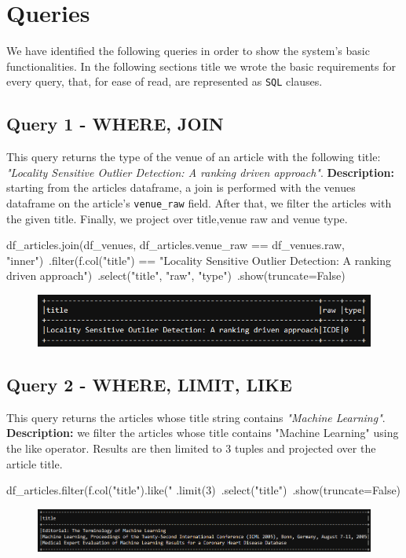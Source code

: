 \documentclass{Configuration_Files/PoliMi3i_thesis}
\begin{document}
\newpage
\section{Queries}
We have identified the following queries in order to show the system's basic functionalities.\newline
In the following sections title we wrote the basic requirements for every query, that, for ease of read, are represented
as \verb |SQL| clauses.

\subsection{Query 1 - WHERE, JOIN}
This query returns the type of the venue of an article with the following title: \emph{"Locality Sensitive Outlier Detection:
A ranking driven approach"}.\newline
\textbf{Description:} starting from the articles dataframe, a join is performed with the venues dataframe on the article's
\verb|venue_raw| field. After that, we filter the articles with the given title. Finally, we project over title,venue raw and venue type.\newline
\begin{python}
df_articles.join(df_venues, df_articles.venue_raw == df_venues.raw, "inner")\
           .filter(f.col("title") == "Locality Sensitive Outlier Detection: A ranking driven approach")\
           .select("title", "raw", "type")\
           .show(truncate=False)
\end{python}
\begin{figure}[H]
\centering
\includegraphics[width=1\textwidth]{query/spark_q1.PNG}
\label{fig:query1}
\end{figure}

\subsection{Query 2 - WHERE, LIMIT, LIKE}
This query returns the articles whose title string contains \emph{"Machine Learning"}.\newline
\textbf{Description:} we filter the articles whose title contains "Machine Learning" using the like operator. Results are then limited
to 3 tuples and projected over the article title.\newline
\begin{python}
df_articles.filter(f.col("title").like("%
           .limit(3)\
           .select("title")\
           .show(truncate=False)
\end{python}
\begin{figure}[H]
\centering
\includegraphics[width=1\textwidth]{query/spark_q2.PNG}
\label{fig:query2}
\end{figure}
\end{document}
